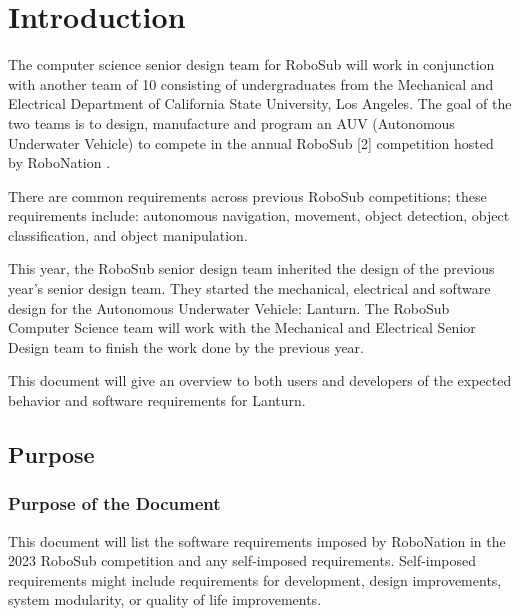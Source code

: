 \section{Introduction}
\label{sec:introduction}

The computer science senior design team for RoboSub will work in conjunction
with another team of 10 consisting of undergraduates from the Mechanical and
Electrical Department of California State University, Los Angeles. The goal of
the two teams is to design, manufacture and program an AUV (Autonomous
Underwater Vehicle) to compete in the annual RoboSub [2] competition hosted by
RoboNation \cite{robonation_2022}.
\par

There are common requirements across previous RoboSub competitions; these
requirements include: autonomous navigation, movement, object detection, object
classification, and object manipulation. 
\par

This year, the RoboSub senior design team inherited the design of the previous
year’s senior design team. They started the mechanical, electrical and software
design for the Autonomous Underwater Vehicle: Lanturn. The RoboSub Computer
Science team will work with the Mechanical and Electrical Senior Design team to
finish the work done by the previous year. 
\par

This document will give an overview to both users and developers of the
expected behavior and software requirements for Lanturn.
\par

\subsection{Purpose}
\label{sec:purpose}
\subsubsection{Purpose of the Document}

This document will list the software requirements imposed by RoboNation in the
2023 RoboSub competition and any self-imposed requirements. Self-imposed
requirements might include requirements for development, design improvements,
system modularity, or quality of life improvements.
\par

